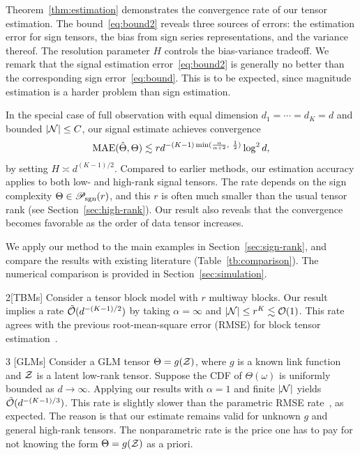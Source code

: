 \documentclass[twoside,11pt]{article}
\theoremstyle{plain}
\theoremstyle{definition}
\def\caliP{\mathscr{P}_{\textup{sgn}}}
\begin{document}
Theorem~\ref{thm:estimation} demonstrates the convergence rate of our tensor estimation. The bound~\eqref{eq:bound2} reveals three sources of errors: the estimation error for sign tensors, the bias from sign series representations, and the variance thereof. The resolution parameter $H$ controls the bias-variance tradeoff. We remark that the signal estimation error~\eqref{eq:bound2} is generally no better than the corresponding sign error~\eqref{eq:bound}. This is to be expected, since magnitude estimation is  a harder problem than sign estimation. 

In the special case of full observation with equal dimension $d_1=\cdots=d_K=d$ and bounded $|\mathcal{N}|\leq C$, our signal estimate achieves convergence
\begin{equation}
\textup{MAE}(\hat \Theta, \Theta)\lesssim rd^{-(K-1)\min({\alpha\over \alpha+2},\ {1\over 2})}\log^2 d,
\end{equation}
by setting $H\asymp d^{(K-1)/2}$. Compared to earlier methods, our estimation accuracy applies to both low- and high-rank signal tensors. The rate depends on the sign complexity $\Theta\in\caliP(r)$, and this $r$ is often much smaller than the usual tensor rank (see Section~\ref{sec:high-rank}). Our result also reveals that the convergence becomes favorable as the order of data tensor increases. 

We apply our method to the main examples in Section~\ref{sec:sign-rank}, and compare the results with existing literature (Table~\ref{tb:comparison}). The numerical comparison is provided in Section~\ref{sec:simulation}. 

\begin{customexample}{2}[TBMs]
Consider a tensor block model with $r$ multiway blocks. Our result implies a rate $\tilde {\mathcal{O}}(d^{-(K-1)/2})$ by taking $\alpha=\infty$ and $|\mathcal{N}| \leq r^K\lesssim \mathcal{O}(1)$. This rate agrees with the  previous root-mean-square error (RMSE) for block tensor estimation~\citep{wang2019multiway}.
\end{customexample}

\begin{customexample}{3} [GLMs] 
Consider a GLM tensor $\Theta=g(\mathcal{Z})$, where $g$ is a known link function and $\mathcal{Z}$ is a latent low-rank tensor. Suppose the CDF of $\Theta(\omega)$ is uniformly bounded as $d\to\infty$. Applying our results with $\alpha=1$ and finite $|\mathcal{N}|$ yields $\tilde {\mathcal{O}}(d^{-(K-1)/3})$. This rate is slightly slower than the parametric RMSE rate~\citep{zhang2018tensor,wang2018learning}, as expected. The reason is that our estimate remains valid for unknown $g$ and general high-rank tensors. The nonparametric rate is the price one has to pay for not knowing the form $\Theta=g(\mathcal{Z})$ as a priori. 
\end{customexample}
\end{document}
